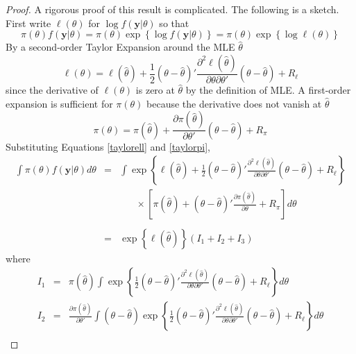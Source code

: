 \documentclass[12pt]{article}
\theoremstyle{definition}
\begin{document}
\begin{proof}
A rigorous proof of this result is complicated. The following is a sketch. First write $\ell(\theta)$ for $\log{f(\mathbf{y}|\theta)}$ so that 
$$\pi(\theta)f(\mathbf{y}|\theta) = \pi(\theta) \exp{\left\{ \log{f(\mathbf{y}| \theta)} \right\}}=\pi(\theta) \exp{\left\{ \log{\ell(\theta)} \right\}}$$
By a second-order Taylor Expansion around the MLE $\hat{\theta}$
	\begin{equation}
	\label{taylorell}
		\ell(\theta) = \ell(\hat{\theta}) +\frac{1}{2} \left( \theta - \hat{\theta}  \right)' \frac{\partial^2 \ell(\hat{\theta})}{\partial \theta \partial \theta'} \left( \theta - \hat{\theta}  \right) + R_\ell
	\end{equation}
since the derivative of $\ell(\theta)$ is zero at $\hat{\theta}$ by the definition of MLE. A first-order expansion is sufficient for $\pi(\theta)$ because the derivative does not vanish at $\hat{\theta}$
	\begin{equation}
		\label{taylorpi}
		\pi(\theta) = \pi(\hat{\theta}) +  \frac{\partial \pi(\hat{\theta})}{\partial \theta'} \left(\theta - \hat{\theta}  \right)+ R_\pi
	\end{equation}
Substituting Equations \ref{taylorell} and \ref{taylorpi},
	\begin{eqnarray*}
		\int \pi(\theta)f(\mathbf{y}|\theta)d\theta &=& \int \exp\left\{ \ell(\hat{\theta}) +\frac{1}{2} \left( \theta - \hat{\theta}  \right)' \frac{\partial^2 \ell(\hat{\theta})}{\partial \theta \partial \theta'} \left( \theta - \hat{\theta}  \right) + R_\ell \right\}\\
		&&\;\;\;\;\;\;\times \left[ \pi(\hat{\theta}) + \left(\theta - \hat{\theta}  \right)' \frac{\partial \pi(\hat{\theta})}{\partial \theta} + R_\pi \right]  d\theta\\\\
		&=& \exp\left\{ \ell(\hat{\theta}) \right\} (I_1 + I_2 + I_3)
	\end{eqnarray*}
where
	\begin{eqnarray*}
		I_1 &=& \pi(\hat{\theta}) \int  \exp{\left\{ \frac{1}{2} \left( \theta - \hat{\theta}  \right)' \frac{\partial^2 \ell(\hat{\theta})}{\partial \theta \partial \theta'} \left( \theta - \hat{\theta}  \right) + R_\ell\right\}} d\theta\\
		I_2 &=& \frac{\partial \pi(\hat{\theta})}{\partial \theta'}   \int  \left(\theta - \hat{\theta}  \right) \exp{\left\{ \frac{1}{2} \left( \theta - \hat{\theta}  \right)' \frac{\partial^2 \ell(\hat{\theta})}{\partial \theta \partial \theta'} \left( \theta - \hat{\theta}  \right) + R_\ell\right\}} d\theta\\

\end{eqnarray*}
\end{proof}
\end{document}

